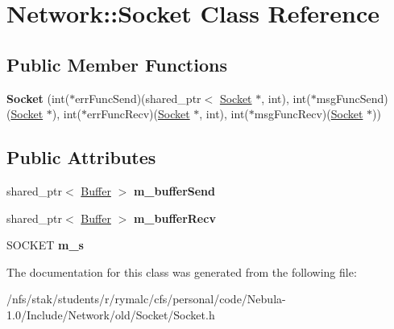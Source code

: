 \hypertarget{classNetwork_1_1Socket}{
\section{Network::Socket Class Reference}
\label{classNetwork_1_1Socket}
}
\subsection*{Public Member Functions}
\begin{DoxyCompactItemize}
\item 
\hypertarget{classNetwork_1_1Socket_a1f53b8dc5f77fec0b7256ed61a282c6c}{
{\bfseries Socket} (int($\ast$errFuncSend)(shared\_\-ptr$<$ \hyperlink{classNetwork_1_1Socket}{Socket} $\ast$, int), int($\ast$msgFuncSend)(\hyperlink{classNetwork_1_1Socket}{Socket} $\ast$), int($\ast$errFuncRecv)(\hyperlink{classNetwork_1_1Socket}{Socket} $\ast$, int), int($\ast$msgFuncRecv)(\hyperlink{classNetwork_1_1Socket}{Socket} $\ast$))}
\label{classNetwork_1_1Socket_a1f53b8dc5f77fec0b7256ed61a282c6c}

\end{DoxyCompactItemize}
\subsection*{Public Attributes}
\begin{DoxyCompactItemize}
\item 
\hypertarget{classNetwork_1_1Socket_a198fb6e2f12293bf2ec41ab5ac77c8fa}{
shared\_\-ptr$<$ \hyperlink{classNetwork_1_1Buffer}{Buffer} $>$ {\bfseries m\_\-bufferSend}}
\label{classNetwork_1_1Socket_a198fb6e2f12293bf2ec41ab5ac77c8fa}

\item 
\hypertarget{classNetwork_1_1Socket_a566d62e3479e5e9486fcc2764c4f8982}{
shared\_\-ptr$<$ \hyperlink{classNetwork_1_1Buffer}{Buffer} $>$ {\bfseries m\_\-bufferRecv}}
\label{classNetwork_1_1Socket_a566d62e3479e5e9486fcc2764c4f8982}

\item 
\hypertarget{classNetwork_1_1Socket_aee25041967b1d1569cc4a8eeff720f42}{
SOCKET {\bfseries m\_\-s}}
\label{classNetwork_1_1Socket_aee25041967b1d1569cc4a8eeff720f42}

\end{DoxyCompactItemize}


The documentation for this class was generated from the following file:\begin{DoxyCompactItemize}
\item 
/nfs/stak/students/r/rymalc/cfs/personal/code/Nebula-\/1.0/Include/Network/old/Socket/Socket.h\end{DoxyCompactItemize}
